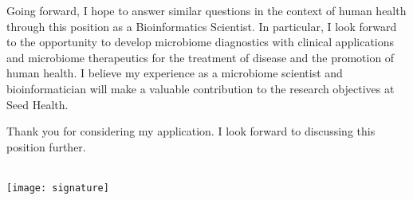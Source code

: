 \documentclass[11pt,letterpaper,sans]{moderncv}        %
\makeatletter
\renewcommand*{\makeletterclosing}{
  \@closing\\[3em]%
  \texttt{[image: signature]}\\%
  {\bfseries \@firstname~\@lastname}%
  \ifthenelse{\isundefined{\@enclosure}}{}{%
    \\%
    \vfill%
    {\color{color2}\itshape\enclname: \@enclosure}}}
\makeatother
\begin{document}
Going forward, I hope to answer similar questions in the context of human
health through this position as a Bioinformatics Scientist. In particular, I look
forward to the opportunity to develop microbiome diagnostics with clinical
applications and microbiome therapeutics for the treatment of disease and the
promotion of human health. I believe my experience as a microbiome scientist
and bioinformatician will make a valuable contribution to the research
objectives at Seed Health.

Thank you for considering my application. I look forward to discussing this
position further.


\makeletterclosing

\end{document}
